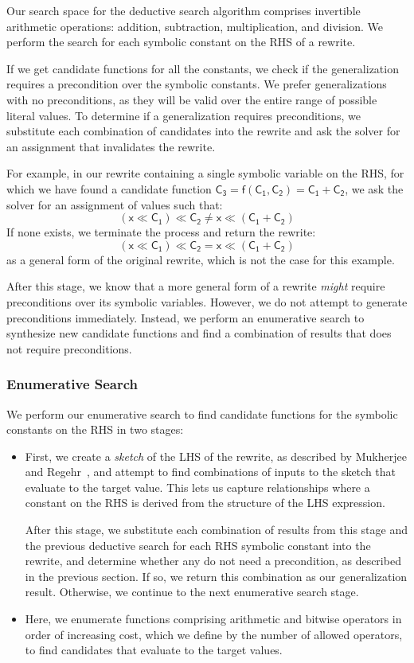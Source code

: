 \documentclass[review, anonymous, acmsmall]{acmart}
\newcommand{\blockmath}[1]{\[\mathsf{#1}\]}
\newcommand{\inline}[1]{$\mathsf{#1}$}
\begin{document}
Our search space for the deductive search algorithm comprises invertible arithmetic operations: addition, subtraction, multiplication, and division. We perform the search for each symbolic constant on the RHS of a rewrite. 

If we get candidate functions for all the constants, we check if the generalization requires a precondition over the symbolic constants. We prefer generalizations with no preconditions, as they will be valid over the entire range of possible literal values. To determine if a generalization requires preconditions, we substitute each combination of candidates into the rewrite and ask the solver for an assignment that invalidates the rewrite. 

For example, in our rewrite containing a single symbolic variable on the RHS, for which we have found a candidate function \inline{C_3 = f(C_1, C_2) = C_1 + C_2}, we ask the solver for an assignment of values such that:
     \blockmath{(x \ll C_1) \ll C_2 \neq x \ll (C_1 + C_2)}
If none exists, we terminate the process and return the rewrite:
 \blockmath{(x \ll C_1) \ll C_2 = x \ll (C_1 + C_2)}
as a general form of the original rewrite, which is not the case for this example.

After this stage, we know that a more general form of a rewrite \textit{might} require preconditions over its symbolic variables. However, we do not attempt to generate preconditions immediately. Instead, we perform an enumerative search to synthesize new candidate functions and find a combination of results that does not require preconditions. 


\subsubsection{Enumerative Search}


We perform our enumerative search to find candidate functions for the symbolic constants on the RHS in two stages:
\begin{itemize}
    \item First, we create a \textit{sketch} of the LHS of the rewrite, as described by Mukherjee and Regehr~\cite{mukherjee_hydra_2024}, and attempt to find combinations of inputs to the sketch that evaluate to the target value. This lets us capture relationships where a constant on the RHS is derived from the structure of the LHS expression. 

    After this stage, we substitute each combination of results from this stage and the previous deductive search for each RHS symbolic constant into the rewrite, and determine whether any do not need a precondition, as described in the previous section. If so, we return this combination as our generalization result. Otherwise, we continue to the next enumerative search stage.

    
    \item Here, we enumerate functions comprising arithmetic and bitwise operators in order of increasing cost, which we define by the number of allowed operators, to find candidates that evaluate to the target values.
    
\end{itemize}
\end{document}

